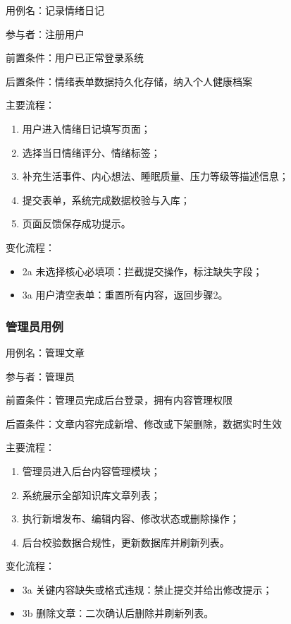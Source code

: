 \par
\indent 用例名：记录情绪日记
\par
\indent 参与者：注册用户
\par
\indent 前置条件：用户已正常登录系统
\par
\indent 后置条件：情绪表单数据持久化存储，纳入个人健康档案
\par
\indent 主要流程：
\begin{enumerate}
    \item 用户进入情绪日记填写页面；
    \item 选择当日情绪评分、情绪标签；
    \item 补充生活事件、内心想法、睡眠质量、压力等级等描述信息；
    \item 提交表单，系统完成数据校验与入库；
    \item 页面反馈保存成功提示。
\end{enumerate}
\par
\indent 变化流程：
\begin{itemize}
    \item 2a 未选择核心必填项：拦截提交操作，标注缺失字段；
    \item 3a 用户清空表单：重置所有内容，返回步骤2。
\end{itemize}

\subsubsection{管理员用例}

\par
\indent 用例名：管理文章
\par
\indent 参与者：管理员
\par
\indent 前置条件：管理员完成后台登录，拥有内容管理权限
\par
\indent 后置条件：文章内容完成新增、修改或下架删除，数据实时生效
\par
\indent 主要流程：
\begin{enumerate}
    \item 管理员进入后台内容管理模块；
    \item 系统展示全部知识库文章列表；
    \item 执行新增发布、编辑内容、修改状态或删除操作；
    \item 后台校验数据合规性，更新数据库并刷新列表。
\end{enumerate}
\par
\indent 变化流程：
\begin{itemize}
    \item 3a 关键内容缺失或格式违规：禁止提交并给出修改提示；
    \item 3b 删除文章：二次确认后删除并刷新列表。
\end{itemize}

